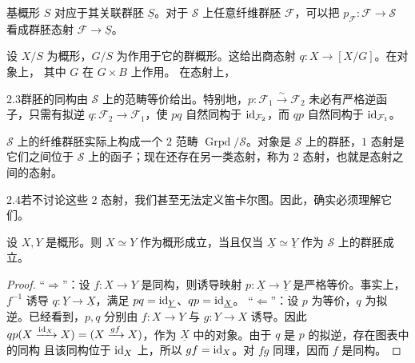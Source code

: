\begin{example}\label{ex:2.10}
基概形 $S$ 对应于其关联群胚 $\underline S$。对于 $\mathcal S$ 上任意纤维群胚 $\mathcal F$，可以把 $p_{\mathcal F}:\mathcal F\to\mathcal S$ 看成群胚态射 $\mathcal F\to\underline S$。
\end{example}
\begin{example}\label{ex:2.11}
设 $X/S$ 为概形，$G/S$ 为作用于它的群概形。这给出商态射 $q:X\to[X/G]$。在对象上，
其中 $G$ 在 $G\times B$ 上作用。
在态射上，
\end{example}
\begin{Note}{2.3}群胚的同构由 $\mathcal S$ 上的范畴等价给出。特别地，$p:\mathcal F_1\xrightarrow{\sim}\mathcal F_2$ 未必有严格逆函子，只需有拟逆 $q:\mathcal F_2\to\mathcal F_1$，使 $pq$ 自然同构于 $\operatorname{id}_{\mathcal F_2}$，而 $qp$ 自然同构于 $\operatorname{id}_{\mathcal F_1}$。\end{Note}
$\mathcal S$ 上的纤维群胚实际上构成一个 $2$ 范畴 $\operatorname{Grpd}/\mathcal S$。对象是 $\mathcal S$ 上的群胚，$1$ 态射是它们之间位于 $\mathcal S$ 上的函子；现在还存在另一类态射，称为 $2$ 态射，也就是态射之间的态射。
\begin{Note}{2.4}若不讨论这些 $2$ 态射，我们甚至无法定义笛卡尔图。因此，确实必须理解它们。\end{Note}
\begin{proposition}\label{pro:2.1}
设 $X,Y$ 是概形。则 $X\simeq Y$ 作为概形成立，当且仅当 $\underline X\simeq\underline Y$ 作为 $\mathcal S$ 上的群胚成立。
\end{proposition}
\begin{proof}
“$\Rightarrow$”：设 $f:X\to Y$ 是同构，则诱导映射 $p:\underline X\to\underline Y$ 是严格等价。事实上，$f^{-1}$ 诱导 $q:\underline Y\to\underline X$，满足 $pq=\operatorname{id}_{\underline Y}$、$qp=\operatorname{id}_{\underline X}$。
“$\Leftarrow$”：设 $p$ 为等价，$q$ 为拟逆。已经看到，$p,q$ 分别由 $f:X\to Y$ 与 $g:Y\to X$ 诱导。因此
$qp(X\xrightarrow{\operatorname{id}_X}X)=(X\xrightarrow{gf}X)$，作为 $\underline X$ 中的对象。由于 $q$ 是 $p$ 的拟逆，存在图表中的同构
且该同构位于 $\operatorname{id}_X$ 上，所以 $gf=\operatorname{id}_X$。对 $fg$ 同理，因而 $f$ 是同构。
\end{proof}
